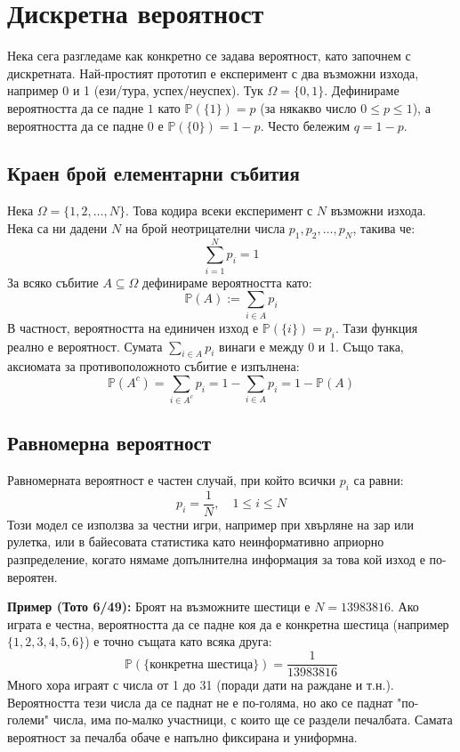 \documentclass{article}
\begin{document}
\section{Дискретна вероятност}

Нека сега разгледаме как конкретно се задава вероятност, като започнем с дискретната.
Най-простият прототип е експеримент с два възможни изхода, например 0 и 1 (ези/тура, успех/неуспех).
Тук $\Omega = \{0, 1\}$. Дефинираме вероятността да се падне $1$ като $\mathbb{P}(\{1\}) = p$ (за някакво число $0 \le p \le 1$), а вероятността да се падне $0$ е $\mathbb{P}(\{0\}) = 1 - p$. Често бележим $q = 1 - p$.

\subsection{Краен брой елементарни събития}
Нека $\Omega = \{1, 2, \dots, N\}$. Това кодира всеки експеримент с $N$ възможни изхода.
Нека са ни дадени $N$ на брой неотрицателни числа $p_1, p_2, \dots, p_N$, такива че:
\[ \sum_{i=1}^N p_i = 1 \]
За всяко събитие $A \subseteq \Omega$ дефинираме вероятността като:
\[ \mathbb{P}(A) := \sum_{i \in A} p_i \]
В частност, вероятността на единичен изход е $\mathbb{P}(\{i\}) = p_i$.
Тази функция реално е вероятност. Сумата $\sum_{i \in A} p_i$ винаги е между 0 и 1. Също така, аксиомата за противоположното събитие е изпълнена:
\[ \mathbb{P}(A^c) = \sum_{i \in A^c} p_i = 1 - \sum_{i \in A} p_i = 1 - \mathbb{P}(A) \]

\subsection{Равномерна вероятност}
Равномерната вероятност е частен случай, при който всички $p_i$ са равни:
\[ p_i = \frac{1}{N}, \quad 1 \le i \le N \]
Този модел се използва за честни игри, например при хвърляне на зар или рулетка, или в байесовата статистика като неинформативно априорно разпределение, когато нямаме допълнителна информация за това кой изход е по-вероятен.

\textbf{Пример (Тото 6/49):} 
Броят на възможните шестици е $N = 13983816$. Ако играта е честна, вероятността да се падне коя да е конкретна шестица (например $\{1, 2, 3, 4, 5, 6\}$) е точно същата като всяка друга:
\[ \mathbb{P}(\{\text{конкретна шестица}\}) = \frac{1}{13983816} \]
Много хора играят с числа от 1 до 31 (поради дати на раждане и т.н.). Вероятността тези числа да се паднат не е по-голяма, но ако се паднат "по-големи" числа, има по-малко участници, с които ще се раздели печалбата. Самата вероятност за печалба обаче е напълно фиксирана и униформна.
\end{document}
